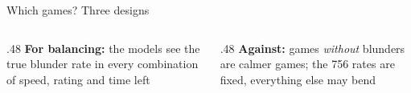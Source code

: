 \documentclass[aspectratio=169,11pt]{beamer}
\begin{document}
\begin{frame}{Which games? Three designs}
  \vspace{.9em}
  \begin{columns}[t]
    \begin{column}{.48\textwidth}
      \textcolor{good}{\textbf{For balancing:}} the models see the true blunder rate in every combination of
      speed, rating and time left
    \end{column}
    \begin{column}{.48\textwidth}
      \textcolor{bad}{\textbf{Against:}} games \emph{without} blunders are calmer games; the 756 rates are
      fixed, everything else may bend
    \end{column}
  \end{columns}
  \vspace{.6em}
  \centering
\end{frame}
\end{document}
